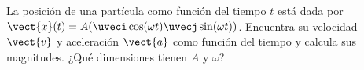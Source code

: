 \documentclass[../main.tex]{subfiles}
\begin{document}
\begin{problema}
	La posición de una partícula como función del tiempo \(t\) está dada
	por \(\vect{x}(t) = A(\uveci\cos(\omega t) \uvecj\sin(\omega t))\).
	Encuentra su velocidad \(\vect{v}\) y aceleración \(\vect{a}\)
	como función del tiempo y calcula sus magnitudes.
	¿Qué dimensiones tienen \(A\) y \(\omega\)?
\end{problema}
\end{document}
